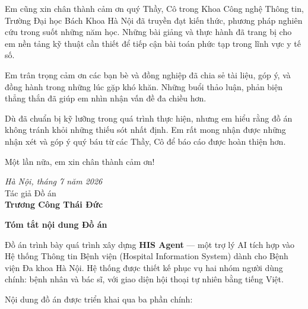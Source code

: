 \documentclass[a4paper,13pt,3p,twoside,openany]{report}
\theoremstyle{definition}
\theoremstyle{remark}
\theoremstyle{definition}
\begin{document}
Em cũng xin chân thành cảm ơn quý Thầy, Cô trong Khoa Công nghệ Thông tin, Trường Đại học Bách Khoa Hà Nội đã truyền đạt kiến thức, phương pháp nghiên cứu trong suốt những năm học. Những bài giảng và thực hành đã trang bị cho em nền tảng kỹ thuật cần thiết để tiếp cận bài toán phức tạp trong lĩnh vực y tế số.

Em trân trọng cảm ơn các bạn bè và đồng nghiệp đã chia sẻ tài liệu, góp ý, và đồng hành trong những lúc gặp khó khăn. Những buổi thảo luận, phản biện thẳng thắn đã giúp em nhìn nhận vấn đề đa chiều hơn.

Dù đã chuẩn bị kỹ lưỡng trong quá trình thực hiện, nhưng em hiểu rằng đồ án không tránh khỏi những thiếu sót nhất định. Em rất mong nhận được những nhận xét và góp ý quý báu từ các Thầy, Cô để báo cáo được hoàn thiện hơn.

Một lần nữa, em xin chân thành cảm ơn!

\vspace{1cm}
\hspace{0.5\textwidth}
\begin{minipage}{0.5\textwidth}
    \begin{center}
        \textit{Hà Nội, tháng 7 năm 2026} \\
        Tác giả Đồ án \\
        \vspace{2cm}
        \textbf{Trương Công Thái Đức}
    \end{center}
\end{minipage}

\newpage
{}
\fontsize{22pt}{16pt}\selectfont
{\bfseries Tóm tắt nội dung Đồ án}
\fontsize{13pt}{16pt}\selectfont
\bigskip
\bigskip

Đồ án trình bày quá trình xây dựng \textbf{HIS Agent} --- một trợ lý AI tích hợp vào Hệ thống Thông tin Bệnh viện (Hospital Information System) dành cho Bệnh viện Đa khoa Hà Nội. Hệ thống được thiết kế phục vụ hai nhóm người dùng chính: bệnh nhân và bác sĩ, với giao diện hội thoại tự nhiên bằng tiếng Việt.

Nội dung đồ án được triển khai qua ba phần chính:
\end{document}
